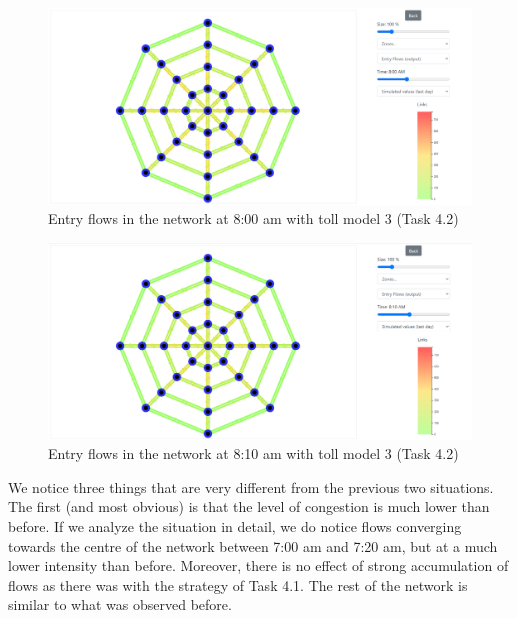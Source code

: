 \documentclass[a4paper, 12pt,oneside]{article}
\begin{document}
\begin{minipage}[c]{0.5\textwidth}
\begin{figure}[H]
    \centering
    \includegraphics[width=1\textwidth]{Images/Step4/results_on_network_task4.2_800am.png}
    \caption{Entry flows in the network at 8:00 am with toll model 3 (Task 4.2)}
    \label{fig:Entry flows in the network at 8:00 am with toll model 3 (Task 4.2)}
\end{figure}
\end{minipage}
\begin{minipage}[c]{0.5\textwidth}
\begin{figure}[H]
    \centering
    \includegraphics[width=1\textwidth]{Images/Step4/results_on_network_task4.2_810am.png}
    \caption{Entry flows in the network at 8:10 am with toll model 3 (Task 4.2)}
    \label{fig:Entry flows in the network at 8:10 am with toll model 3 (Task 4.2)}
\end{figure}
\end{minipage}
\newline

We notice three things that are very different from the previous two situations.\\

The first (and most obvious) is that the level of congestion is much lower than before. If we analyze the situation in detail, we do notice flows converging towards the centre of the network between 7:00 am and 7:20 am, but at a much lower intensity than before. Moreover, there is no effect of strong accumulation of flows as there was with the strategy of Task 4.1. The rest of the network is similar to what was observed before.\\
\end{document}

